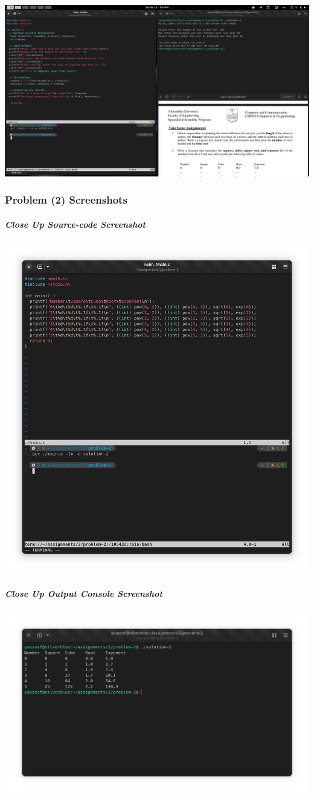 \documentclass[a4paper,11pt]{article}
\theoremstyle{mytheor}
\theoremstyle{mytheor}
\begin{document}
\includegraphics[width=1\linewidth,center]{desktop-1.png}
\newpage
\subsubsection{Problem (2) Screenshots}
\subparagraph{Close Up Source-code Screenshot\\}
\includegraphics[width=1\linewidth,center]{src-2.png}
\subparagraph{Close Up Output Console Screenshot\\}
\includegraphics[width=1\linewidth,center]{out-2.png}
\end{document}
